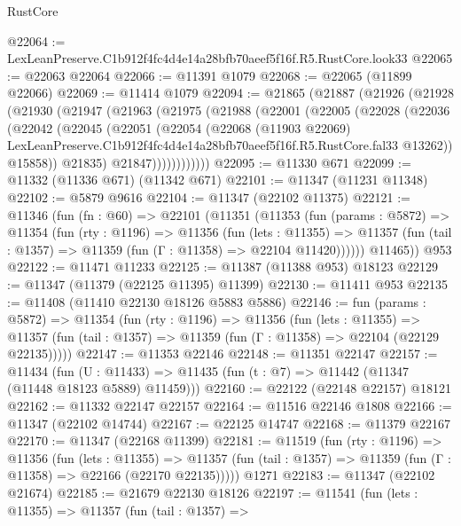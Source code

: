 \begin{lexlean}{RustCore}
\begin{coremodule}
@22064 := LexLeanPreserve.C1b912f4fc4d4e14a28bfb70aeef5f16f.R5.RustCore.look33
@22065 := @22063 @22064
@22066 := @11391 @1079
@22068 := @22065 (@11899 @22066)
@22069 := @11414 @1079
@22094 := @21865
    (@21887
      (@21926
        (@21928
          (@21930
            (@21947
              (@21963
                (@21975
                  (@21988
                    (@22001
                      (@22005
                        (@22028
                          (@22036
                            (@22042
                              (@22045
                                (@22051
                                  (@22054
                                    (@22068
                                      (@11903 @22069)
                                      LexLeanPreserve.C1b912f4fc4d4e14a28bfb70aeef5f16f.R5.RustCore.fal33
                                      @13262))
                                  @15858))
                              @21835)
                            @21847))))))))))))
@22095 := @11330 @671
@22099 := @11332 (@11336 @671) (@11342 @671)
@22101 := @11347 (@11231 @11348)
@22102 := @5879 @9616
@22104 := @11347 (@22102 @11375)
@22121 := @11346
    (fun (fn : @60) =>
    @22101
      (@11351
        (@11353
          (fun (params : @5872) =>
          @11354
            (fun (rty : @1196) =>
            @11356
              (fun (lets : @11355) =>
              @11357 (fun (tail : @1357) => @11359 (fun (Γ : @11358) => @22104 @11420))))))
        @11465))
    @953
@22122 := @11471 @11233
@22125 := @11387 (@11388 @953) @18123
@22129 := @11347 (@11379 (@22125 @11395) @11399)
@22130 := @11411 @953
@22135 := @11408 (@11410 @22130 @18126 @5883 @5886)
@22146 := fun (params : @5872) =>
  @11354
    (fun (rty : @1196) =>
    @11356
      (fun (lets : @11355) =>
      @11357 (fun (tail : @1357) => @11359 (fun (Γ : @11358) => @22104 (@22129 @22135)))))
@22147 := @11353 @22146
@22148 := @11351 @22147
@22157 := @11434
    (fun (U : @11433) => @11435 (fun (t : @7) => @11442 (@11347 (@11448 @18123 @5889) @11459)))
@22160 := @22122 (@22148 @22157) @18121
@22162 := @11332 @22147 @22157
@22164 := @11516 @22146 @1808
@22166 := @11347 (@22102 @14744)
@22167 := @22125 @14747
@22168 := @11379 @22167
@22170 := @11347 (@22168 @11399)
@22181 := @11519
    (fun (rty : @1196) =>
    @11356
      (fun (lets : @11355) =>
      @11357 (fun (tail : @1357) => @11359 (fun (Γ : @11358) => @22166 (@22170 @22135)))))
    @1271
@22183 := @11347 (@22102 @21674)
@22185 := @21679 @22130 @18126
@22197 := @11541
    (fun (lets : @11355) =>
    @11357
      (fun (tail : @1357) =>

\end{coremodule}
\end{lexlean}
